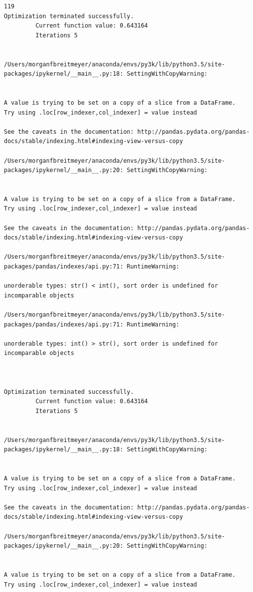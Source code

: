 \begin{lstlisting}
119
Optimization terminated successfully.
         Current function value: 0.643164
         Iterations 5


/Users/morganfbreitmeyer/anaconda/envs/py3k/lib/python3.5/site-packages/ipykernel/__main__.py:18: SettingWithCopyWarning:


A value is trying to be set on a copy of a slice from a DataFrame.
Try using .loc[row_indexer,col_indexer] = value instead

See the caveats in the documentation: http://pandas.pydata.org/pandas-docs/stable/indexing.html#indexing-view-versus-copy

/Users/morganfbreitmeyer/anaconda/envs/py3k/lib/python3.5/site-packages/ipykernel/__main__.py:20: SettingWithCopyWarning:


A value is trying to be set on a copy of a slice from a DataFrame.
Try using .loc[row_indexer,col_indexer] = value instead

See the caveats in the documentation: http://pandas.pydata.org/pandas-docs/stable/indexing.html#indexing-view-versus-copy

/Users/morganfbreitmeyer/anaconda/envs/py3k/lib/python3.5/site-packages/pandas/indexes/api.py:71: RuntimeWarning:

unorderable types: str() < int(), sort order is undefined for incomparable objects

/Users/morganfbreitmeyer/anaconda/envs/py3k/lib/python3.5/site-packages/pandas/indexes/api.py:71: RuntimeWarning:

unorderable types: int() > str(), sort order is undefined for incomparable objects



Optimization terminated successfully.
         Current function value: 0.643164
         Iterations 5


/Users/morganfbreitmeyer/anaconda/envs/py3k/lib/python3.5/site-packages/ipykernel/__main__.py:18: SettingWithCopyWarning:


A value is trying to be set on a copy of a slice from a DataFrame.
Try using .loc[row_indexer,col_indexer] = value instead

See the caveats in the documentation: http://pandas.pydata.org/pandas-docs/stable/indexing.html#indexing-view-versus-copy

/Users/morganfbreitmeyer/anaconda/envs/py3k/lib/python3.5/site-packages/ipykernel/__main__.py:20: SettingWithCopyWarning:


A value is trying to be set on a copy of a slice from a DataFrame.
Try using .loc[row_indexer,col_indexer] = value instead


\end{lstlisting}
